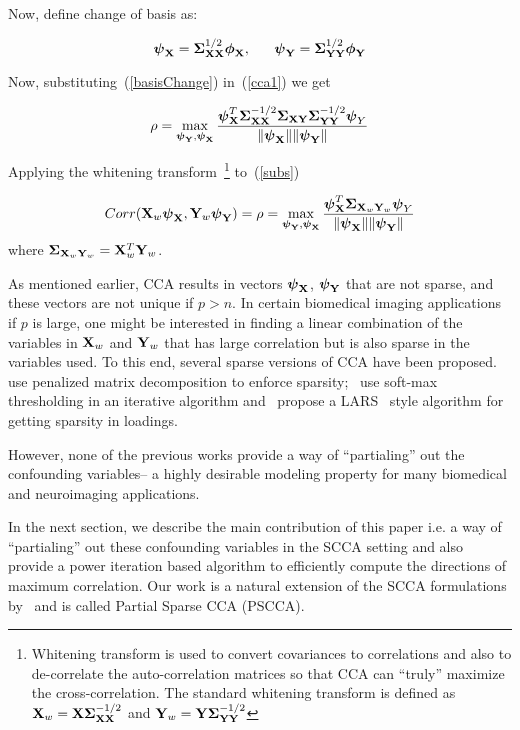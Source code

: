 \documentclass{llncs}
\newcommand{\X}{{\bf X}}
\newcommand{\Y}{{\bf Y}}
\newcommand{\bs}{\boldsymbol}
\begin{document}
Now, define change of basis as:

\begin{equation}
\label{basisChange}
\bs\psi_{\X} = \bs\Sigma_{\X\X}^{1/2}\bs\phi_{\X}, \;\;\;\;\;\;   \bs\psi_{\Y} = \bs\Sigma_{\Y\Y}^{1/2}\bs\phi_{\Y} 
\end{equation}

Now, substituting~(\ref{basisChange}) in~(\ref{cca1}) we get 

\begin{equation}
\label{subs}
\rho= \max_{{\bs\psi_{\Y}}, {\bs\psi_{\X}}} \frac{\bs\psi_{\X}^T \bs\Sigma_{\X\X}^{-1/2}\bs\Sigma_{\X\Y}\bs\Sigma_{\Y\Y}^{-1/2}\bs\psi_Y}{\|\bs\psi_{\X}\| \|\bs\psi_{\Y}\|}
\end{equation}

Applying the whitening transform~\footnote{Whitening transform is used to convert covariances to correlations and also to de-correlate the auto-correlation matrices so that CCA can ``truly'' maximize the cross-correlation. The standard whitening transform is defined as $\X_w= \X\bs\Sigma_{\X\X}^{-1/2}$ and $\Y_w= \Y\bs\Sigma_{\Y\Y}^{-1/2}$} to~(\ref{subs})

\begin{equation}
\label{simplifiedcca}
Corr(\X_w\bs\psi_{\X},\Y_w\bs\psi_{\Y})=\rho=\max_{{\bs\psi_{\Y}}, {\bs\psi_{\X}}} \frac{\bs\psi_{\X}^T \bs\Sigma_{\X_w\Y_w}\bs\psi_Y}{\|\bs\psi_{\X}\| \|\bs\psi_{\Y}\|}
\end{equation}
where $\bs\Sigma_{\X_w\Y_w} = \X_w^T\Y_w$. 

As mentioned earlier, CCA results in vectors $\bs\psi_{\X}$, $\bs\psi_{\Y}$ that are not sparse, and these vectors are not unique if $p > n$. In certain biomedical imaging applications if $p$ is large, one might be interested in finding a linear combination of the variables in $\X_w$ and $\Y_w$ that has large correlation but is also sparse in the variables used. To this end, several sparse versions of CCA have been proposed. ~\cite{parkhomenko} use penalized matrix decomposition to enforce sparsity;~\cite{parkhomenko} use soft-max thresholding in an iterative algorithm and~\cite{lykou} propose a LARS~\cite{lars} style algorithm for getting sparsity in loadings.

However, none of the previous works provide a way of ``partialing'' out the confounding variables-- a highly desirable modeling property for many biomedical and neuroimaging applications. 

In the next section, we describe the main contribution of this paper i.e. a way of ``partialing'' out these confounding variables in the SCCA setting and also provide a power iteration based algorithm to efficiently compute the directions of maximum correlation. Our work is a natural extension of the SCCA formulations by~\cite{parkhomenko,witten} and is called Partial Sparse CCA (PSCCA).
\end{document}
